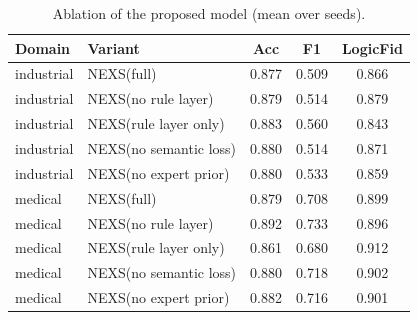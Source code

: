 \begin{table}[t]\centering
\caption{Ablation of the proposed model (mean over seeds).}
\label{tab:abl}
\begin{tabular}{llccc}
\toprule
Domain & Variant & Acc & F1 & LogicFid \\
\midrule
industrial & NEXS(full) & 0.877 & 0.509 & 0.866 \\
industrial & NEXS(no rule layer) & 0.879 & 0.514 & 0.879 \\
industrial & NEXS(rule layer only) & 0.883 & 0.560 & 0.843 \\
industrial & NEXS(no semantic loss) & 0.880 & 0.514 & 0.871 \\
industrial & NEXS(no expert prior) & 0.880 & 0.533 & 0.859 \\
\midrule
medical & NEXS(full) & 0.879 & 0.708 & 0.899 \\
medical & NEXS(no rule layer) & 0.892 & 0.733 & 0.896 \\
medical & NEXS(rule layer only) & 0.861 & 0.680 & 0.912 \\
medical & NEXS(no semantic loss) & 0.880 & 0.718 & 0.902 \\
medical & NEXS(no expert prior) & 0.882 & 0.716 & 0.901 \\
\bottomrule
\end{tabular}
\end{table}